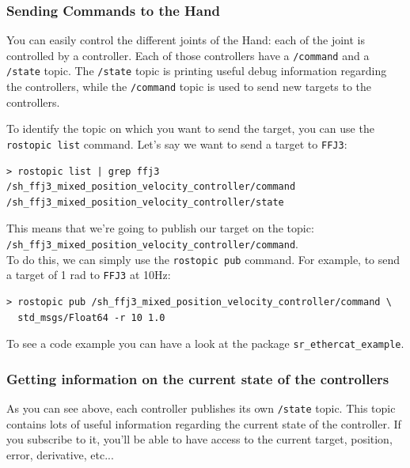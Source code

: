 \documentclass[12pt]{article}
\begin{document}
\subsubsection{Sending Commands to the Hand}
\par You can easily control the different joints of the Hand: each of the joint is controlled by a controller. Each of those controllers have a \texttt{/command} and a \texttt{/state} topic. The \texttt{/state} topic is printing useful debug information regarding the controllers, while the \texttt{/command} topic is used to send new targets to the controllers.\\

\par To identify the topic on which you want to send the target, you can use the \texttt{rostopic list} command. Let's say we want to send a target to \texttt{FFJ3}:
  \begin{lstlisting}[escapeinside='']
> rostopic list | grep ffj3
/sh_ffj3_mixed_position_velocity_controller/command
/sh_ffj3_mixed_position_velocity_controller/state
  \end{lstlisting}

\par This means that we're going to publish our target on the topic:\\
\hspace*{40pt} \texttt{/sh\_ffj3\_mixed\_position\_velocity\_controller/command}.\\
To do this, we can simply use the \texttt{rostopic pub} command. For example, to send a target of 1 rad to \texttt{FFJ3} at 10Hz:
  \begin{lstlisting}[escapeinside='']
> rostopic pub /sh_ffj3_mixed_position_velocity_controller/command \
  std_msgs/Float64 -r 10 1.0
  \end{lstlisting}

\par To see a code example you can have a look at the package \texttt{sr\_ethercat\_example}.

\subsubsection{Getting information on the current state of the controllers}
\par As you can see above, each controller publishes its own \texttt{/state} topic. This topic contains lots of useful information regarding the current state of the controller. If you subscribe to it, you'll be able to have access to the current target, position, error, derivative, etc...
\end{document}
